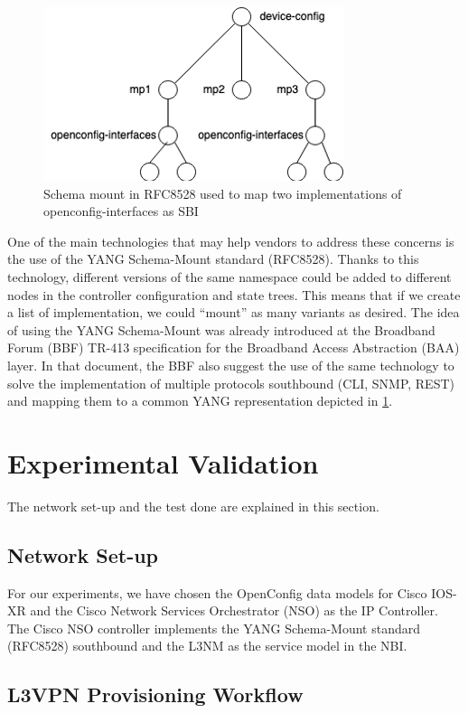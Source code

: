 \documentclass[conference]{IEEEtran}
\begin{document}
\begin{figure}
	\centering
		\includegraphics[scale=0.9]{figure3.png}
	\caption{Schema mount in RFC8528 used to map two implementations of openconfig-interfaces as SBI}
	\label{FIG:3}
\end{figure}

One of the main technologies that may help vendors to address these concerns is the use of the YANG Schema-Mount standard (RFC8528). Thanks to this technology, different versions of the same namespace could be added to different nodes in the controller configuration and state trees. This means that if we create a list of implementation, we could “mount” as many variants as desired. The idea of using the YANG Schema-Mount was already introduced at the Broadband Forum (BBF) TR-413 specification for the Broadband Access Abstraction (BAA) layer. In that document, the BBF also suggest the use of the same technology to solve the implementation of multiple protocols southbound (CLI, SNMP, REST) and mapping them to a common YANG representation depicted in \cref{FIG:3}.
\section{Experimental Validation}
The network set-up and the test done are explained in this section.

\subsection{Network Set-up}
For our experiments, we have chosen the OpenConfig data models for Cisco IOS-XR and the Cisco Network Services Orchestrator (NSO) as the IP Controller. The Cisco NSO controller implements the YANG Schema-Mount standard (RFC8528) southbound and the L3NM as the service model in the NBI.

\subsection{L3VPN Provisioning Workflow}
\end{document}
